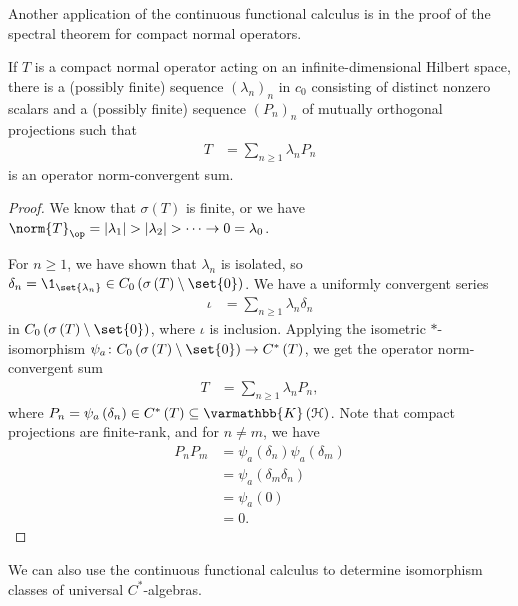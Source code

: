 \documentclass[10pt]{mypackage}
\renewcommand*{\mathbb}[1]{\varmathbb{#1}}
\newcommand{\K}{\mathbb{K}}
\begin{document}
Another application of the continuous functional calculus is in the proof of the spectral theorem for compact normal operators.
\begin{theorem}
  If $T$ is a compact normal operator acting on an infinite-dimensional Hilbert space, there is a (possibly finite) sequence $\left(\lambda_n\right)_n$ in $c_0$ consisting of distinct nonzero scalars and a (possibly finite) sequence $\left(P_n\right)_n$ of mutually orthogonal projections such that
  \begin{align*}
    T &= \sum_{n\geq 1}\lambda_nP_n
  \end{align*}
  is an operator norm-convergent sum.
\end{theorem}
\begin{proof}
  We know that $\sigma(T)$ is finite, or we have $\norm{T}_{\op} = \left\vert \lambda_1 \right\vert > \left\vert \lambda_2 \right\vert > \cdots \rightarrow 0 = \lambda_0$.\newline

  For $n\geq 1$, we have shown that $\lambda_n$ is isolated, so $\delta_n = \1_{\set{\lambda_n}}\in C_0\left(\sigma\left(T\right)\setminus \set{0}\right)$. We have a uniformly convergent series
  \begin{align*}
    \iota &= \sum_{n\geq 1}\lambda_n\delta_n
  \end{align*}
  in $C_0\left(\sigma\left(T\right)\setminus \set{0}\right)$, where $\iota$ is inclusion. Applying the isometric $\ast$-isomorphism $\psi_a\colon C_0\left(\sigma\left(T\right)\setminus \set{0}\right)\rightarrow C^{\ast}\left(T\right)$, we get the operator norm-convergent sum
  \begin{align*}
    T &= \sum_{n\geq 1}\lambda_nP_n,
  \end{align*}
  where $P_n = \psi_a\left(\delta_n\right)\in C^{\ast}\left(T\right)\subseteq \K\left(\mathcal{H}\right)$. Note that compact projections are finite-rank, and for $n\neq m$, we have
  \begin{align*}
    P_nP_m &= \psi_a\left(\delta_n\right)\psi_a\left(\delta_m\right)\\
           &= \psi_a\left(\delta_{m}\delta_n\right)\\
           &= \psi_a\left(0\right)\\
           &= 0.
  \end{align*}
\end{proof}
We can also use the continuous functional calculus to determine isomorphism classes of universal $C^{\ast}$-algebras.
\end{document}
